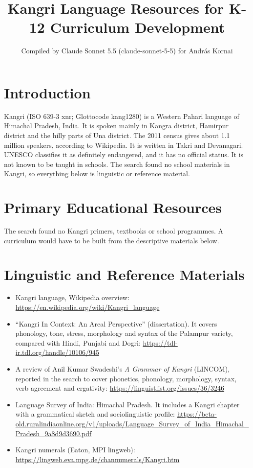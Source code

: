 \documentclass[12pt]{article}
\title{Kangri Language Resources for K-12 Curriculum Development}
\author{Compiled by Claude Sonnet 5.5 (claude-sonnet-5-5) for Andr\'as Kornai}
\date{}
\begin{document}
\maketitle

\section{Introduction}
Kangri (ISO 639-3 xnr; Glottocode kang1280) is a Western Pahari language of Himachal Pradesh, India. It is spoken mainly in Kangra district, Hamirpur district and the hilly parts of Una district. The 2011 census gives about 1.1 million speakers, according to Wikipedia. It is written in Takri and Devanagari. UNESCO classifies it as definitely endangered, and it has no official status. It is not known to be taught in schools. The search found no school materials in Kangri, so everything below is linguistic or reference material.

\section{Primary Educational Resources}
The search found no Kangri primers, textbooks or school programmes. A curriculum would have to be built from the descriptive materials below.

\section{Linguistic and Reference Materials}
\begin{itemize}
\item Kangri language, Wikipedia overview: \url{https://en.wikipedia.org/wiki/Kangri_language}
\item ``Kangri In Context: An Areal Perspective'' (dissertation). It covers phonology, tone, stress, morphology and syntax of the Palampur variety, compared with Hindi, Punjabi and Dogri: \url{https://tdl-ir.tdl.org/handle/10106/945}
\item A review of Anil Kumar Swadeshi's \emph{A Grammar of Kangri} (LINCOM), reported in the search to cover phonetics, phonology, morphology, syntax, verb agreement and ergativity: \url{https://linguistlist.org/issues/36/3246}
\item Language Survey of India: Himachal Pradesh. It includes a Kangri chapter with a grammatical sketch and sociolinguistic profile: \url{https://beta-old.ruralindiaonline.org/v1/uploads/Language_Survey_of_India_Himachal_Pradesh_9a8d9d3690.pdf}
\item Kangri numerals (Eaton, MPI lingweb): \url{https://lingweb.eva.mpg.de/channumerals/Kangri.htm}
\end{itemize}
\end{document}
